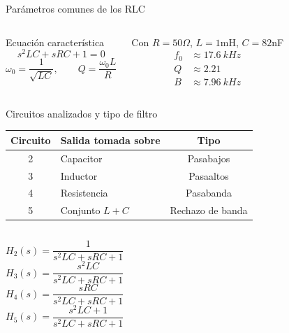 \documentclass[aspectratio=169,11pt]{beamer}
\begin{document}
\begin{frame}{Parámetros comunes de los RLC}
    \begin{columns}[T,onlytextwidth]
        \begin{block}{Ecuación característica}
        \begin{equation*}
            s^2LC+sRC+1=0
        \end{equation*}
        \begin{equation*}
            \omega_0=\frac{1}{\sqrt{LC}},\qquad Q=\frac{\omega_0 L}{R}
        \end{equation*}
        \end{block}
        \begin{block}{Con $R=50\Omega$, $L=1$mH, $C=82$nF}
        \begin{align*}
            f_0&\approx \SI{17.6}{kHz}\\
            Q&\approx 2.21\\
            B&\approx \SI{7.96}{kHz}
        \end{align*}
        \end{block}
    \end{columns}
\end{frame}

\begin{frame}{Circuitos analizados y tipo de filtro}
    \begin{center}
    \begin{tabular}{clc}
        \toprule
        Circuito & Salida tomada sobre & Tipo \\
        \midrule
        2 & Capacitor & Pasabajos \\
        3 & Inductor & Pasaaltos \\
        4 & Resistencia & Pasabanda \\
        5 & Conjunto $L+C$ & Rechazo de banda \\
        \bottomrule
    \end{tabular}
    \end{center}
    \vspace{0.8em}
    \begin{columns}[T,onlytextwidth]
        \begin{equation*}
            H_2(s)=\frac{1}{s^2LC+sRC+1}
        \end{equation*}
        \begin{equation*}
            H_3(s)=\frac{s^2LC}{s^2LC+sRC+1}
        \end{equation*}
        \begin{equation*}
            H_4(s)=\frac{sRC}{s^2LC+sRC+1}
        \end{equation*}
        \begin{equation*}
            H_5(s)=\frac{s^2LC+1}{s^2LC+sRC+1}
        \end{equation*}
    \end{columns}
\end{frame}
\end{document}
